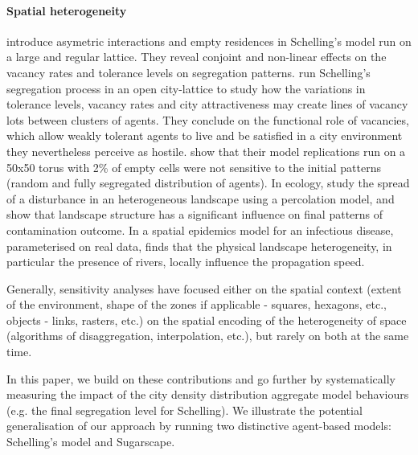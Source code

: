 \documentclass[preprint,5p,times,twocolumn,authoryear]{elsarticle}
\begin{document}
\paragraph{Spatial heterogeneity} \citet{StaufferSolomon2007} introduce asymetric interactions and empty residences in Schelling's model run on a large and regular lattice. They reveal conjoint and non-linear effects on the vacancy rates and tolerance levels on segregation patterns. \citet{Gauvinetal2010} run Schelling's segregation process in an open city-lattice to study how the variations in tolerance levels, vacancy rates and city attractiveness may create lines of vacancy lots between clusters of agents. They conclude on the functional role of vacancies, which allow weakly tolerant agents to live and be satisfied in a city environment they nevertheless perceive as hostile. \citet{HatnaBenenson2012} show that their model replications run on a 50x50 torus with 2\% of empty cells were not sensitive to the initial patterns (random and fully segregated distribution of agents). In ecology, \citet{smith2002predicting} study the spread of a disturbance in an heterogeneous landscape using a percolation model, and show that landscape structure has a significant influence on final patterns of contamination outcome. In a spatial epidemics model for an infectious disease, parameterised on real data, \citet{smith2002predicting} finds that the physical landscape heterogeneity, in particular the presence of rivers, locally influence the propagation speed.

Generally, sensitivity analyses have focused either on the spatial context (extent of the environment, shape of the zones if applicable - squares, hexagons, etc., objects - links, rasters, etc.)  on the spatial encoding of the heterogeneity of space (algorithms of disaggregation, interpolation, etc.), but rarely on both at the same time.  
 
 


In this paper, we build on these contributions and go further by systematically measuring the impact of the city density distribution aggregate model behaviours (e.g. the final segregation level for Schelling). We illustrate the potential generalisation of our approach by running two distinctive agent-based models: Schelling's model and Sugarscape.
\end{document}
